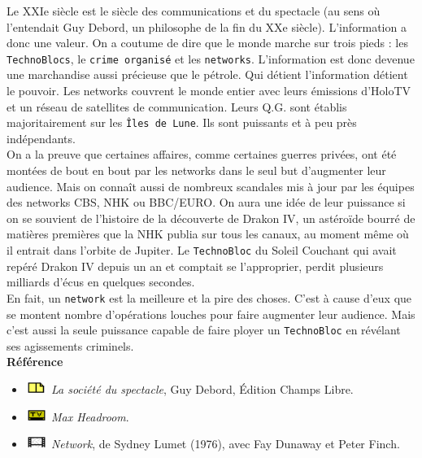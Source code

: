 \documentclass[11pt,twoside,a4paper]{article}
\def\imgCACINE{\includegraphics[width=0.70cm,height=0.40cm]{img/pucecine.png} }
\def\imgCALIVR{\includegraphics[width=0.70cm,height=0.40cm]{img/pucelivr.png} }
\def\imgCATVTV{\includegraphics[width=0.70cm,height=0.40cm]{img/pucetv.png} }
\begin{document}
\begin{multicols*}{2}
Le XXIe si{\`e}cle est le si{\`e}cle des communications et du spectacle (au sens o{\`u} l'entendait Guy Debord, un philosophe de la fin du XXe si{\`e}cle). L'information a donc une valeur. On a coutume de dire que le monde marche sur trois pieds : les \texttt{TechnoBlocs}, le \texttt{crime organis{\'e}} et les \texttt{networks}. L'information est donc devenue une marchandise aussi pr{\'e}cieuse que le p{\'e}trole. Qui d{\'e}tient l'information d{\'e}tient le pouvoir. Les networks couvrent le monde entier avec leurs {\'e}missions d'HoloTV et un r{\'e}seau de satellites de communication. Leurs Q.G. sont {\'e}tablis majoritairement sur les \texttt{{\^I}les de Lune}. Ils sont puissants et {\`a} peu pr{\`e}s ind{\'e}pendants.~\\

On a la preuve que certaines affaires, comme certaines guerres priv{\'e}es, ont {\'e}t{\'e} mont{\'e}es de bout en bout par les networks dans le seul but d'augmenter leur audience. Mais on conna{\^i}t aussi de nombreux scandales mis {\`a} jour par les {\'e}quipes des networks CBS, NHK ou BBC/EURO. On aura une id{\'e}e de leur puissance si on se souvient de l'histoire de la d{\'e}couverte de Drakon IV, un ast{\'e}ro{\"i}de bourr{\'e} de mati{\`e}res premi{\`e}res que la NHK publia sur tous les canaux, au moment m{\^e}me o{\`u} il entrait dans l'orbite de Jupiter. Le \texttt{TechnoBloc} du Soleil Couchant qui avait rep{\'e}r{\'e} Drakon IV depuis un an et comptait se l'approprier, perdit plusieurs milliards d'{\'e}cus en quelques secondes.~\\

En fait, un \texttt{network} est la meilleure et la pire des choses. C'est {\`a} cause d'eux que se montent nombre d'op{\'e}rations louches pour faire augmenter leur audience. Mais c'est aussi la seule puissance capable de faire ployer un \texttt{TechnoBloc} en r{\'e}v{\'e}lant ses agissements criminels.~\\

\textbf{R{\'e}f{\'e}rence}
\begin{itemize}
	\small
	\item \imgCALIVR \emph{La soci{\'e}t{\'e} du spectacle}, Guy Debord, {\'E}dition Champs Libre.
	\item \imgCATVTV \emph{Max Headroom}.
	\item \imgCACINE \emph{Network}, de Sydney Lumet (1976), avec Fay Dunaway et Peter Finch.
\end{itemize}

\vfill ~\\ \columnbreak


\end{multicols*}
\end{document}
